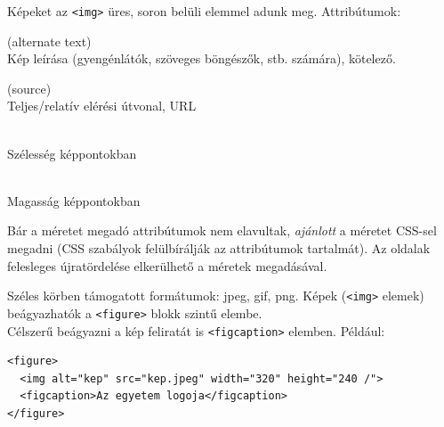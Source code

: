 \documentclass[usenames,dvipsnames,aspectratio=169]{beamer}
\begin{document}
\begin{frame}
  Képeket az \texttt{<img>} üres, soron belüli elemmel adunk meg. Attribútumok:
  \begin{description}[m]
    \item[\texttt{alt}] (alternate text) \hfill \\ Kép leírása (gyengénlátók, szöveges böngészők, stb. számára), kötelező.
    \item[\texttt{src}] (source) \hfill \\ Teljes/relatív elérési útvonal, URL
    \item[\texttt{width}] \hfill \\ Szélesség képpontokban
    \item[\texttt{height}] \hfill \\ Magasság képpontokban
  \end{description}
  Bár a méretet megadó attribútumok nem elavultak, \emph{ajánlott} a méretet CSS-sel megadni (CSS szabályok felülbírálják az attribútumok tartalmát). Az oldalak felesleges újratördelése elkerülhető a méretek megadásával.
\end{frame}

\begin{frame}[fragile]
  Széles körben támogatott formátumok: jpeg, gif, png.
  \vfill
  Képek (\texttt{<img>} elemek) beágyazhatók a \texttt{<figure>} blokk szintű elembe.\\
  Célszerű beágyazni a kép feliratát is \texttt{<figcaption>} elemben.
  \vfill
  Például:
  \begin{verbatim}
<figure>
  <img alt="kep" src="kep.jpeg" width="320" height="240 /">
  <figcaption>Az egyetem logoja</figcaption>
</figure>
  \end{verbatim}
\end{frame}
\end{document}

